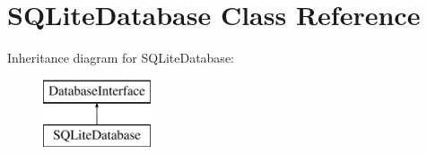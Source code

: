\hypertarget{class_s_q_lite_database}{}\section{S\+Q\+Lite\+Database Class Reference}
\label{class_s_q_lite_database}
Inheritance diagram for S\+Q\+Lite\+Database\+:\begin{figure}[H]
\begin{center}
\leavevmode
\includegraphics[height=2.000000cm]{class_s_q_lite_database}
\end{center}
\end{figure}
